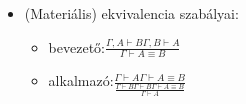 \begin{definition}
\begin{itemize}
\begin{itemize}
\begin{itemize}
		\end{itemize}
		\item (Materiális) ekvivalencia szabályai:
		\begin{itemize}
			\item bevezető:$\frac{\Gamma,A\vdash B \Gamma,B\vdash A}{\Gamma\vdash A\equiv B}$
			\item alkalmazó:$\frac{\Gamma\vdash A \Gamma\vdash A\equiv B}{\frac{\Gamma\vdash B \Gamma\vdash B \Gamma\vdash A \equiv B}{\Gamma\vdash A}}$
		\end{itemize}
	\end{itemize}
\end{itemize}
\end{definition}
